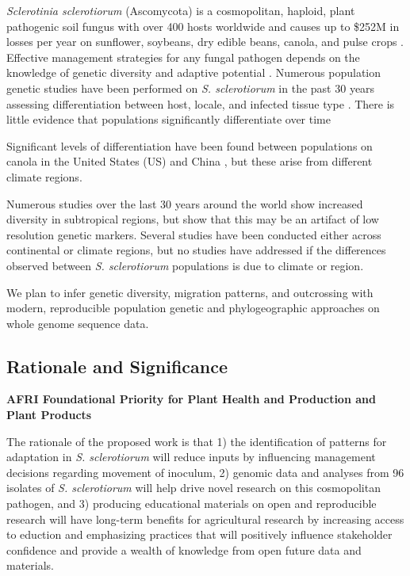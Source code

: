 \documentclass[12pt,letterpaper]{article}
\begin{document}
\textit{Sclerotinia sclerotiorum} (Ascomycota) is a cosmopolitan, haploid, plant pathogenic soil fungus with over 400 hosts worldwide \citep{bolton2006sclerotinia} and causes up to \$252M in losses per year on sunflower, soybeans, dry edible beans, canola, and pulse crops \citep{uscanola}.
Effective management strategies for any fungal pathogen depends on the knowledge of genetic diversity and adaptive potential \citep{grunwald2016population}.
Numerous population genetic studies have been performed on \textit{S. sclerotiorum} in the past 30 years assessing differentiation between host, locale, and infected tissue type \citep{bolton2006sclerotinia,lehner2017sclerotinia}. There is little evidence that populations significantly differentiate over time 

Significant levels of differentiation have been found between populations on canola in the United States (US) and China \citep{attanayake2013sclerotinia}, but these arise from different climate regions. 


Numerous studies over the last 30 years around the world show increased diversity in subtropical regions, but \citet{lehner2017sclerotinia} show that this may be an artifact of low resolution genetic markers.
Several studies have been conducted either across continental or climate regions, but no studies have addressed if the differences observed between \textit{S. sclerotiorum} populations is due to climate or region. 


We plan to infer genetic diversity, migration patterns, and outcrossing with modern, reproducible population genetic and phylogeographic approaches on whole genome sequence data. 





\subsection{Rationale and Significance}


\noindent
\textbf{AFRI Foundational Priority for Plant Health and Production and Plant Products}

The rationale of the proposed work is that 1) the identification of patterns for adaptation in \textit{S. sclerotiorum} will reduce inputs by influencing management decisions regarding movement of inoculum, 2) genomic data and analyses from 96 isolates of \textit{S. sclerotiorum} will help drive novel research on this cosmopolitan pathogen, and 3) producing educational materials on open and reproducible research will have long-term benefits for agricultural research by increasing access to eduction and emphasizing practices that will positively influence stakeholder confidence and provide a wealth of knowledge from open future data and materials. 
\end{document}

